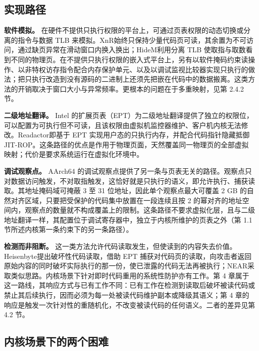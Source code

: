 \subsection{实现路径}

\textbf{软件模拟。} 在硬件不提供只执行权限的平台上，可通过页表权限的动态切换或分离的指令与数据 TLB 来模拟。XnR\citep{backes2014xnr}始终只保持少量代码页可读，其余置为不可访问，通过缺页异常在滑动窗口内换入换出；HideM\citep{gionta2015hidem}利用分离 TLB 使取指与取数看到不同的物理页。在不提供只执行权限的嵌入式平台上，另有以软件掩码约束读操作\citep{braden2016leakage}、以非特权访存指令配合内存保护单元\citep{kwon2019uxom}、以及以调试监视比较器实现只执行\citep{shen2020picoxom}的做法；把只执行改造到没有源码的二进制上还须先把嵌在代码中的数据搬离\citep{chen2017norax}。这类方法的开销取决于窗口大小与异常频率。更根本的问题在于多重映射，见第 2.4.2 节。

\textbf{二级地址翻译。} Intel 的扩展页表（EPT）\citep{intel2023sdm}为二级地址翻译提供了独立的权限位，可以配置为可执行但不可读，且该权限由虚拟机监控器维护、客户机内核无法修改。Readactor\citep{crane2015readactor}即基于 EPT 实现用户态的只执行内存，并配合代码指针隐藏抵御 JIT-ROP。这条路径的优点是作用于物理页面，天然覆盖同一物理页的全部虚拟映射；代价是要求系统运行在虚拟化环境中。

\textbf{调试观察点。} AArch64 的调试观察点提供了另一条与页表无关的路径。观察点只对数据访问触发，不对取指触发，这恰好就是只执行的语义，即允许执行、捕获读取。其地址掩码域可掩蔽 3 至 31 位地址，因此单个观察点最大可覆盖 2 GB 的自然对齐区域，只要把受保护的代码集中放置在一段连续且按 2 的幂对齐的地址空间内，观察点的数量就不构成覆盖上的限制。这条路径不要求虚拟化层，且与二级地址翻译一样，其配置位于调试寄存器中，独立于内核所维护的页表之外（第 1.1 节所述内核第一条约束下的另一条路径）。

\textbf{检测而非阻断。} 这一类方法允许代码读取发生，但使读到的内容失去价值。Heisenbyte\citep{tang2015heisenbyte}提出破坏性代码读取，借助 EPT 捕获对代码页的读取，向攻击者返回原始内容的同时破坏实际执行的那一份，使已泄露的代码无法再被执行；NEAR\citep{werner2016near}采取类似思路。内核场景下针对即时代码重用的系统性防护亦有工作\citep{pomonis2019krx}。第 4 章属于这一路线，其响应方式与已有工作不同：已有工作在检测到读取后破坏被读代码或禁止其后续执行，因而必须为每一处被读代码维护副本或降级其语义；第 4 章的响应是触发一次针对性的重随机化，不改变被读代码的任何语义。二者的差异见第 4.2 节。

\subsection{内核场景下的两个困难}


